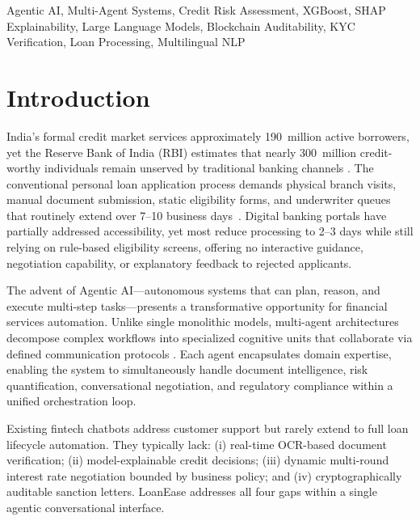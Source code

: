 \documentclass[conference]{IEEEtran}
\begin{document}
\begin{IEEEkeywords}
Agentic AI, Multi-Agent Systems, Credit Risk Assessment,
XGBoost, SHAP Explainability, Large Language Models,
Blockchain Auditability, KYC Verification, Loan Processing,
Multilingual NLP
\end{IEEEkeywords}


\section{Introduction}

India's formal credit market services approximately
190~million active borrowers, yet the Reserve Bank of
India (RBI) estimates that nearly 300~million credit-worthy
individuals remain unserved by traditional banking channels
\cite{rbi2024}. The conventional personal loan application
process demands physical branch visits, manual document
submission, static eligibility forms, and underwriter
queues that routinely extend over 7--10 business
days~\cite{niti2023digitalfinance}. Digital banking
portals have partially addressed accessibility, yet most
reduce processing to 2--3 days while still relying on
rule-based eligibility screens, offering no interactive
guidance, negotiation capability, or explanatory feedback
to rejected applicants.

The advent of Agentic AI---autonomous systems that can
plan, reason, and execute multi-step tasks---presents a
transformative opportunity for financial services
automation. Unlike single monolithic models, multi-agent
architectures decompose complex workflows into specialized
cognitive units that collaborate via defined communication
protocols \cite{wu2023autogen,wang2024survey}. Each agent
encapsulates domain expertise, enabling the system to
simultaneously handle document intelligence, risk
quantification, conversational negotiation, and regulatory
compliance within a unified orchestration loop.

Existing fintech chatbots address customer support but
rarely extend to full loan lifecycle automation. They
typically lack: (i) real-time OCR-based document
verification; (ii) model-explainable credit decisions;
(iii) dynamic multi-round interest rate negotiation bounded
by business policy; and (iv) cryptographically auditable
sanction letters. LoanEase addresses all four gaps within
a single agentic conversational interface.
\end{document}
